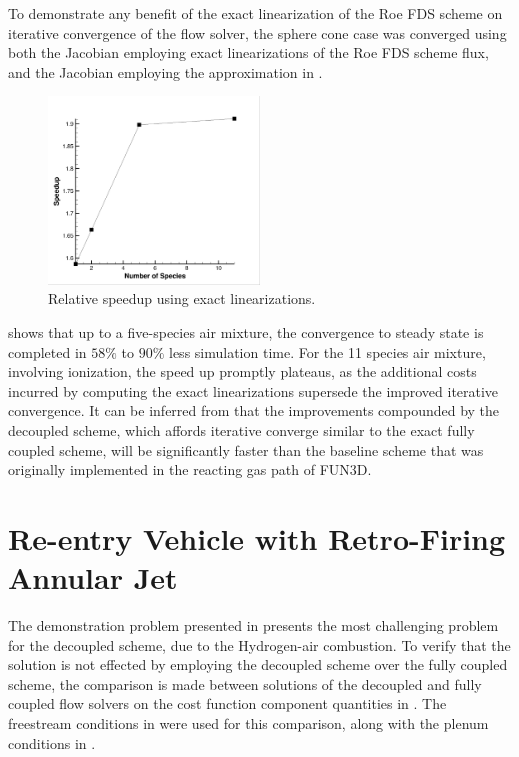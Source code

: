 To demonstrate any benefit of the exact linearization of the Roe FDS scheme on
iterative convergence of the flow solver, the sphere cone case was converged
using both the Jacobian employing exact linearizations of the Roe FDS scheme
flux, and the Jacobian employing the approximation in .
\begin{figure}[h]
  \centering
  \includegraphics[width=0.5\textwidth]{figures/flow-efficiency/exact-approx-speedup.png}
  \caption{Relative speedup using exact linearizations.}
  \label{fig:exact-approx-speedup}
\end{figure}
 shows that up to a five-species air mixture, the
convergence to steady state is completed in $58\%$ to $90\%$ less simulation
time.  For the 11 species air mixture, involving ionization, the speed up
promptly plateaus, as the additional costs incurred by computing the exact
linearizations supersede the improved iterative convergence.  It can be inferred
from  that the improvements compounded by the
decoupled scheme, which affords iterative converge similar to the exact fully
coupled scheme, will be significantly faster than the baseline scheme that was
originally implemented in the reacting gas path of FUN3D.

\section{Re-entry Vehicle with Retro-Firing Annular Jet}

The demonstration problem presented in 
presents the most challenging problem for the decoupled scheme, due to the
Hydrogen-air combustion.  To verify that the solution is not effected by
employing the decoupled scheme over the fully coupled scheme, the comparison is
made between solutions of the decoupled and fully coupled flow solvers on the
cost function component quantities in .  The
freestream conditions in  were used for this
comparison, along with the plenum conditions in .

